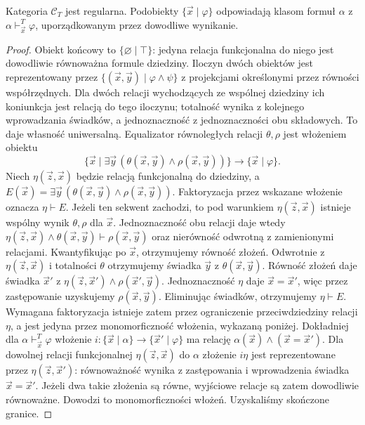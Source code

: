 \begin{twierdzenie}\label{cat:thm:cl-syntactic-regular}
Kategoria $\mathcal C_T$ jest regularna. Podobiekty $\{\vec x\mid\varphi\}$ odpowiadają klasom formuł $\alpha$ z $\alpha\vdash^T_{\vec x}\varphi$, uporządkowanym przez dowodliwe wynikanie.
\end{twierdzenie}
\begin{proof}
Obiekt końcowy to $\{\varnothing\mid\top\}$: jedyna relacja funkcjonalna do niego jest dowodliwie równoważna formule dziedziny. Iloczyn dwóch obiektów jest reprezentowany przez $\{(\vec x,\vec y)\mid\varphi\wedge\psi\}$ z projekcjami określonymi przez równości współrzędnych. Dla dwóch relacji wychodzących ze wspólnej dziedziny ich koniunkcja jest relacją do tego iloczynu; totalność wynika z kolejnego wprowadzania świadków, a jednoznaczność z jednoznaczności obu składowych. To daje własność uniwersalną. Equalizator równoległych relacji $\theta,\rho$ jest włożeniem obiektu
\[
 \{\vec x\mid\exists\vec y\,(\theta(\vec x,\vec y)\wedge\rho(\vec x,\vec y))\}
 \longrightarrow\{\vec x\mid\varphi\}.
\]
Niech $\eta(\vec z,\vec x)$ będzie relacją funkcjonalną do dziedziny, a $E(\vec x)=\exists\vec y\,(\theta(\vec x,\vec y)\wedge\rho(\vec x,\vec y))$. Faktoryzacja przez wskazane włożenie oznacza $\eta\vdash E$. Jeżeli ten sekwent zachodzi, to pod warunkiem $\eta(\vec z,\vec x)$ istnieje wspólny wynik $\theta,\rho$ dla $\vec x$. Jednoznaczność obu relacji daje wtedy $\eta(\vec z,\vec x)\wedge\theta(\vec x,\vec y)\vdash\rho(\vec x,\vec y)$ oraz nierówność odwrotną z zamienionymi relacjami. Kwantyfikując po $\vec x$, otrzymujemy równość złożeń. Odwrotnie z $\eta(\vec z,\vec x)$ i totalności $\theta$ otrzymujemy świadka $\vec y$ z $\theta(\vec x,\vec y)$. Równość złożeń daje świadka $\vec x'$ z $\eta(\vec z,\vec x')\wedge\rho(\vec x',\vec y)$. Jednoznaczność $\eta$ daje $\vec x=\vec x'$, więc przez zastępowanie uzyskujemy $\rho(\vec x,\vec y)$. Eliminując świadków, otrzymujemy $\eta\vdash E$. Wymagana faktoryzacja istnieje zatem przez ograniczenie przeciwdziedziny relacji $\eta$, a jest jedyna przez monomorficzność włożenia, wykazaną poniżej. Dokładniej dla $\alpha\vdash_{\vec x}^T\varphi$ włożenie $i:\{\vec x\mid\alpha\}\to\{\vec x'\mid\varphi\}$ ma relację $\alpha(\vec x)\wedge(\vec x=\vec x')$. Dla dowolnej relacji funkcjonalnej $\eta(\vec z,\vec x)$ do $\alpha$ złożenie $i\eta$ jest reprezentowane przez $\eta(\vec z,\vec x')$: równoważność wynika z zastępowania i wprowadzenia świadka $\vec x=\vec x'$. Jeżeli dwa takie złożenia są równe, wyjściowe relacje są zatem dowodliwie równoważne. Dowodzi to monomorficzności włożeń. Uzyskaliśmy skończone granice.


\end{proof}
